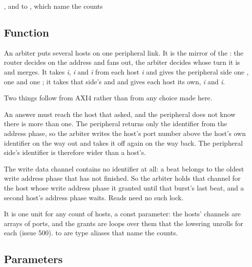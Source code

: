 
%
{, and  to , which name the counts}%
{}

\subsection*{Function}

An arbiter puts several hosts on one peripheral link. It is the
mirror of the : the router decides on the address and
fans out, the arbiter decides whose turn it is and merges. It takes
\textit{i}, \textit{i} and \textit{i} from
each host \textit{i} and gives the peripheral side one , one
 and one ; it takes that side's  and
 and gives each host its own, \textit{i} and \textit{i}.

Two things follow from AXI4 rather than from any choice made here.

An answer must reach the host that asked, and the peripheral does not
know there is more than one. The peripheral returns only the
identifier from the address phase, so the arbiter writes the host's
port number above the host's own identifier on the way out and takes
it off again on the way back. The peripheral side's identifier is
therefore wider than a host's.

The write data channel contains no identifier at all: a beat belongs
to the oldest write address phase that has not finished. So the
arbiter holds that channel for the host whose write address phase it
granted until that burst's last beat, and a second host's address
phase waits. Reads need no such lock.

It is one unit for any count of hosts,  a const parameter:
the hosts' channels are arrays of ports, and the grants are loops
over them that the lowering unrolls for each  (issue 500).
 to  are type aliases that name the
counts.

\subsection*{Parameters}

